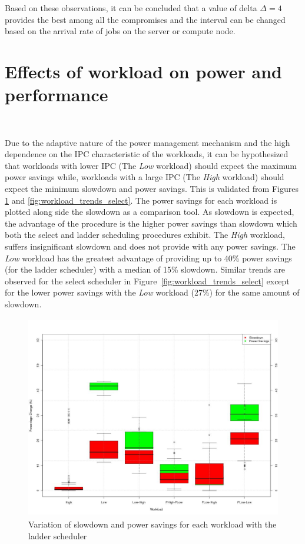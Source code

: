 Based on these observations, it can be concluded that a value of delta $\Delta = 4$ provides
the best among all the compromises and the interval can be changed based on the arrival rate
of jobs on the server or compute node.

\section{Effects of workload on power and performance}~\label{sec:trends}

Due to the adaptive nature of the power management mechanism and the high dependence
on the IPC characteristic of the workloads, it can be hypothesized
that workloads with lower IPC (The \textit{Low} workload) should expect the maximum
power savings while, workloads with a large IPC (The \textit{High} workload) should
expect the minimum slowdown and power savings. This is validated from Figures \ref{fig:workload_trends_ladder}
and \ref{fig:workload_trends_select}. The power savings for each workload is plotted
along side the slowdown as a comparison tool. As slowdown is expected, the advantage of the procedure
is the higher power savings than slowdown which both the select and ladder scheduling
procedures exhibit. The \textit{High} workload, suffers insignificant slowdown and 
does not provide with any power savings. The \textit{Low} workload has the greatest advantage
of providing up to 40\% power savings (for the ladder scheduler) with a median of 15\% slowdown.
Similar trends are observed for the select scheduler in Figure~\ref{fig:workload_trends_select} 
except for the lower power savings with the \textit{Low} workload (27\%) for the same amount of 
slowdown.

\begin{figure}[h!]
  \begin{center}
    \includegraphics[height=3.5in]{figures/trends_workload_ladder.jpg}%
    \caption{Variation of slowdown and power savings for each workload with the ladder scheduler}
    \label{fig:workload_trends_ladder}
  \end{center}
\end{figure}

